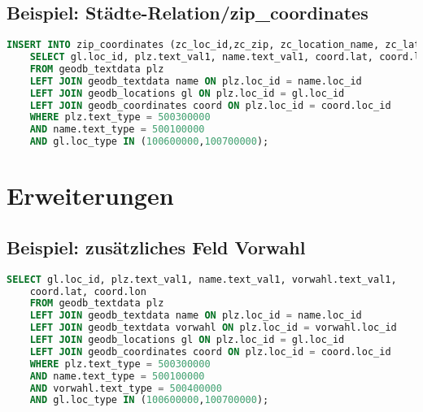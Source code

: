 \documentclass[11pt,a4paper,DIV=10,]{scrartcl}
\begin{document}
\subsection*{Beispiel: Städte-Relation/zip\_coordinates}
\begin{lstlisting}[language=sql]
INSERT INTO zip_coordinates (zc_loc_id,zc_zip, zc_location_name, zc_lat, zc_lon) 
	SELECT gl.loc_id, plz.text_val1, name.text_val1, coord.lat, coord.lon
	FROM geodb_textdata plz
	LEFT JOIN geodb_textdata name ON plz.loc_id = name.loc_id 
	LEFT JOIN geodb_locations gl ON plz.loc_id = gl.loc_id
	LEFT JOIN geodb_coordinates coord ON plz.loc_id = coord.loc_id
	WHERE plz.text_type = 500300000
	AND name.text_type = 500100000 
	AND gl.loc_type IN (100600000,100700000);
\end{lstlisting}
\section*{Erweiterungen}
\subsection*{Beispiel: zusätzliches Feld Vorwahl}
\begin{lstlisting}[language=sql]
SELECT gl.loc_id, plz.text_val1, name.text_val1, vorwahl.text_val1, 
	coord.lat, coord.lon
	FROM geodb_textdata plz
	LEFT JOIN geodb_textdata name ON plz.loc_id = name.loc_id 
	LEFT JOIN geodb_textdata vorwahl ON plz.loc_id = vorwahl.loc_id
	LEFT JOIN geodb_locations gl ON plz.loc_id = gl.loc_id
	LEFT JOIN geodb_coordinates coord ON plz.loc_id = coord.loc_id
	WHERE plz.text_type = 500300000
	AND name.text_type = 500100000 
	AND vorwahl.text_type = 500400000
	AND gl.loc_type IN (100600000,100700000);
\end{lstlisting}
\end{document}
